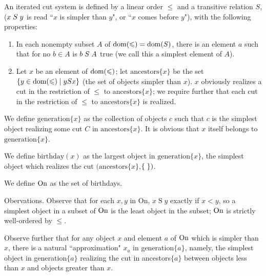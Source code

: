 \begin{definition}
 An {\upshape iterated cut system} is defined by a
 linear 
 order $\leq$ and a transitive
 relation $S$, ($x \mathrel{S} y$ is read ``$x$ is simpler than $y$",
 or  ``$x$ comes before $y$"), with the following properties:
 \begin{enumerate}
  \item In each nonempty subset $A$ of $\mathop{\mathrm{dom}}(\leqslant) = \mathop{\mathrm{dom}}(S)$,
    there is an element $a$ such that for no $b \in A$ is $b \mathrel{S} A$ true (we
    call this a {\upshape simplest element} of $A$).

  \item Let $x$ be an element of $\mathop{\mathrm{dom}}(\leqslant)$; let
    $\mathrm{ancestors}\{x\}$ be the set $\{y \in \mathop{\mathrm{dom}}(\leqslant) \mid y S x\}$ (the
    set of
    objects simpler than $x$).  $x$ obviously realizes a cut in the restriction
    of $\leq$ to $\mathrm{ancestors}\{x\}$; we require further that each cut in
    the
    restriction of $\leq$ to $\mathrm{ancestors}\{x\}$ is realized.
\end{enumerate}
\end{definition}

\begin{definitions}
 We define $\mathrm{generation}\{x\}$ as the collection of objects $c$
 such that $c$ is the simplest object realizing some cut $C$ in
 $\mathrm{ancestors}\{x\}$.  It is obvious that $x$ itself belongs to
 $\mathrm{generation}\{x\}$.

 We define $\mathrm{birthday}(x)$ as the largest object in
 $\mathrm{generation}\{x\}$, the simplest object which realizes the cut
 $(\mathrm{ancestors}\{x\}$,$\mbox{$\{\;\}$})$.  

 We define\/ $\mathrm{On}$ as the set of {\upshape birthdays}.  
\end{definitions}

\begin{ThmEtc}{Obervations.}
 Observe that for each $x,y$ in On, $x \mathrel{S} y$ exactly if $x < y$, so a
 simplest
 object in a subset of $\mathrm{On}$ is the least object in the subset;
 $\mathrm{On}$ is 
 strictly well-ordered by $\leq$.  

 Observe further that for any object $x$ and
 element $a$ of $\mathrm{On}$ which is simpler than $x$, there is a natural
 ``approximation" $x_a$ in generation$\{a\}$, namely, the simplest
 object in generation$\{a\}$ realizing the cut in ances\-tors$\{a\}$
 between objects less than $x$ and objects greater than $x$.
\end{ThmEtc}

